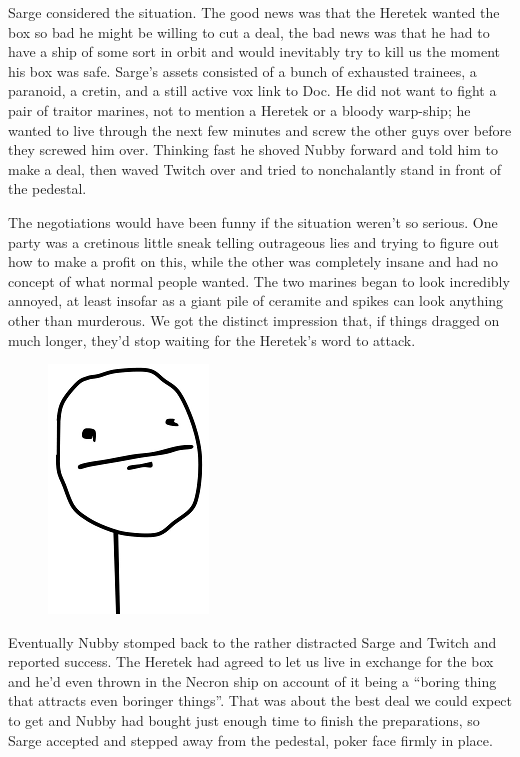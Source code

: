 Sarge considered the situation. 
The good news was that the Heretek wanted the box so bad he might be willing to cut a deal, the bad news was that he had to have a ship of some sort in orbit and would inevitably try to kill us the moment his box was safe. 
Sarge’s assets consisted of a bunch of exhausted trainees, a paranoid, a cretin, and a still active vox link to Doc. 
He did not want to fight a pair of traitor marines, not to mention a Heretek or a bloody warp-ship; 
he wanted to live through the next few minutes and screw the other guys over before they screwed him over. 
Thinking fast he shoved Nubby forward and told him to make a deal, then waved Twitch over and tried to nonchalantly stand in front of the pedestal.
 
The negotiations would have been funny if the situation weren't so serious. 
One party was a cretinous little sneak telling outrageous lies and trying to figure out how to make a profit on this, while the other was completely insane and had no concept of what normal people wanted. 
The two marines began to look incredibly annoyed, at least insofar as a giant pile of ceramite and spikes can look anything other than murderous. 
We got the distinct impression that, if things dragged on much longer, they'd stop waiting for the Heretek's word to attack.

\begin{figure}
	\begin{center}
		\includegraphics[width=\figwidth]{pics/8/53.png}
	\end{center}
\end{figure}
Eventually Nubby stomped back to the rather distracted Sarge and Twitch and reported success. 
The Heretek had agreed to let us live in exchange for the box and he’d even thrown in the Necron ship on account of it being a “boring thing that attracts even boringer things”. 
That was about the best deal we could expect to get and Nubby had bought just enough time to finish the preparations, so Sarge accepted and stepped away from the pedestal, poker face firmly in place.
 
